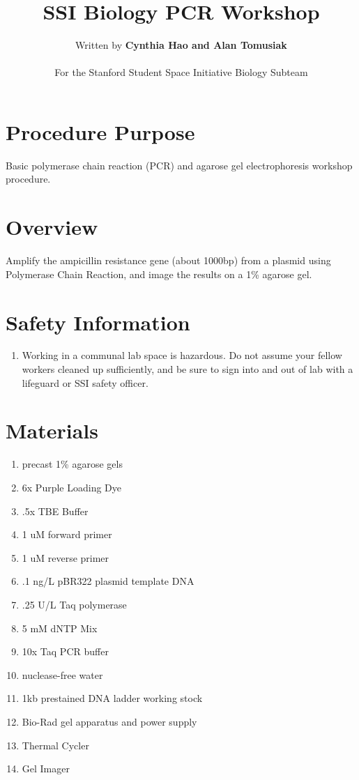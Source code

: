 \documentclass[letterpaper]{article}
\title{SSI Biology PCR Workshop} %
\author{Written by \textbf{Cynthia Hao and Alan Tomusiak}\\ %
\\ %
        For the Stanford Student Space Initiative Biology Subteam}
\newenvironment{safety}{%
\begin{tcolorbox}[width=\textwidth, colframe=safetyFrame, arc=1.5mm]
}%
{\end{tcolorbox}}
\newcommand{\uL}{\micro{}L}
\newcommand{\B}[1]{\textbf{#1}}
\newcommand{\SYBRGreen}{\item{\B{SYBR Green I Gel Stain} binds to nucleic acids and is classified by the European Union as a mutagen of category 3. It should be handled with gloves and stored away from light at all times. The stock solution should be handled with particular caution as DMSO solvent is known to facilitate the entry of organic molecules into tissues.\cite{sybrGreenI}}}
\begin{document}
\maketitle

\section{Procedure Purpose} %
Basic polymerase chain reaction (PCR) and agarose gel electrophoresis workshop procedure.

\section{Overview} %
Amplify the ampicillin resistance gene (about 1000bp) from a plasmid using Polymerase Chain Reaction, and image the results on a 1\% agarose gel.

\section{Safety Information}
\begin{safety}
\begin{enumerate}
\item{Working in a communal lab space is hazardous. Do not assume your fellow workers cleaned up sufficiently, and be sure to sign into and out of lab with a lifeguard or SSI safety officer.}
\end{enumerate}
\end{safety}

\section{Materials}
\begin{enumerate}
\item{precast 1\% agarose gels}
\item{6x Purple Loading Dye}
\item{.5x TBE Buffer}
\item{1 uM forward primer}
\item{1 uM reverse primer}
\item{.1 ng/\uL{} pBR322 plasmid template DNA}
\item{.25 U/\uL{} Taq polymerase}
\item{5 mM dNTP Mix}
\item{10x Taq PCR buffer}
\item{nuclease-free water}
\item{1kb prestained DNA ladder working stock}
\item{Bio-Rad gel apparatus and power supply}
\item{Thermal Cycler}
\item{Gel Imager}
\end{enumerate}
\end{document}
